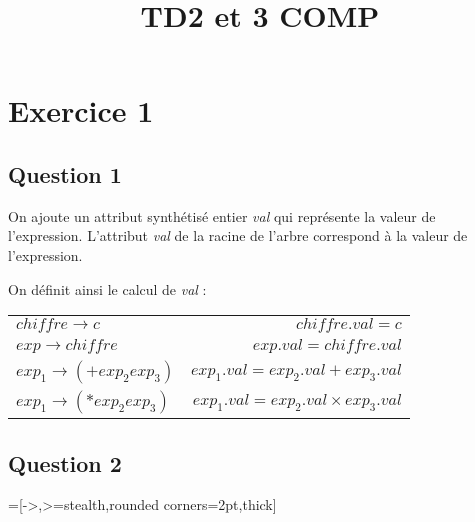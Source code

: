 \documentclass[a4paper, 11pt]{article}
\title{TD2 et 3 COMP}
\author{}
\begin{document}
	\maketitle
	
\section{Exercice 1}
	
\subsection{Question 1}
	
	On ajoute un attribut synthétisé entier \textit{val} qui représente la valeur 
	de l'expression. L'attribut \textit{val} de la racine de l'arbre correspond à 
	la valeur de l'expression.
	
	On définit ainsi le calcul de \textit{val} :
	\begin{center}
		\begin{tabular}{l | r}
			$\mathit{chiffre} \rightarrow c $&$ \mathit{chiffre.val} = c $\\
			$\mathit{exp} \rightarrow \mathit{chiffre} $&$ \mathit{exp.val} = 
			\mathit{chiffre.val}$ \\
			$\mathit{exp}_1 \rightarrow (+ \mathit{exp}_2 \mathit{exp}_3) $&$ 
			\mathit{exp}_1\mathit{.val} =	\mathit{exp}_2\mathit{.val} + 
			\mathit{exp}_3\mathit{.val}$ \\
			$\mathit{exp}_1 \rightarrow (* \mathit{exp}_2 \mathit{exp}_3) $&$ 
			\mathit{exp}_1\mathit{.val} =	\mathit{exp}_2\mathit{.val} \times 
			\mathit{exp}_3\mathit{.val}$
		\end{tabular}
	\end{center}
	
	\subsection{Question 2}
	
	=[->,>=stealth,rounded corners=2pt,thick]
	
\end{document}
